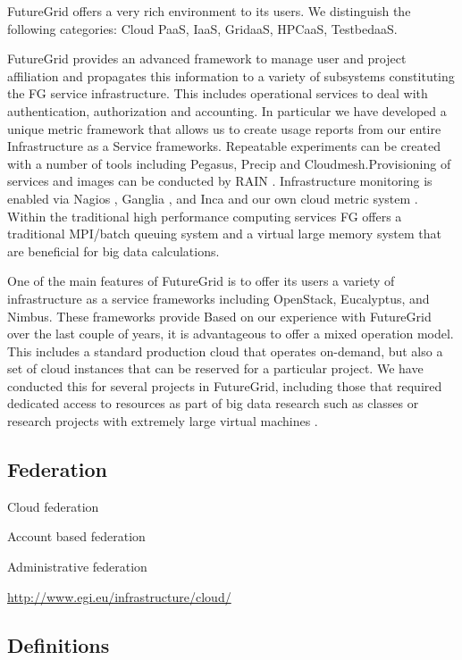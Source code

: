 \documentclass{tex/sig-alternate}
\begin{document}
FutureGrid offers a very rich environment to its users. We distinguish the following categories: Cloud PaaS, IaaS, GridaaS, HPCaaS, TestbedaaS.

FutureGrid provides an advanced framework to manage user and project affiliation and propagates this information to a variety of subsystems constituting the FG service infrastructure. This includes operational services to deal with authentication, authorization and accounting. In particular we have developed a unique metric framework that allows us to create usage reports from our entire Infrastructure as a Service frameworks. Repeatable experiments can be created with a number of tools including Pegasus, Precip and Cloudmesh.Provisioning of services and images can be conducted by RAIN \cite{imagemanagement,fg-1295}. Infrastructure monitoring is enabled via Nagios \cite{nagios}, Ganglia \cite{ganglia}, and Inca \cite{inca} and our own cloud metric system \cite{las08federated-cloud}.
Within the traditional high performance computing services FG offers a traditional MPI/batch queuing system and a virtual large memory system that are beneficial for big data calculations.


One of the main features of FutureGrid is to offer its users a variety
of infrastructure as a service frameworks
\cite{comparisoncloud,las2011virt} including OpenStack, Eucalyptus,
and Nimbus. These frameworks provide Based on our experience
with FutureGrid over the last couple of years, it is advantageous to
offer a mixed operation model. This includes a standard production
cloud that operates on-demand, but also a set of cloud instances that
can be reserved for a particular project. We have conducted this for
several projects in FutureGrid, including those that required
dedicated access to resources as part of big data research such as
classes \cite{fg405,fg368} or research projects with extremely large
virtual machines \cite{fg298}.


\subsection{Federation}

Cloud federation

Account based federation

Administrative federation

\url{http://www.egi.eu/infrastructure/cloud/}


\cite{kurze2011cloudfederation}


\subsection{Definitions}
\end{document}
